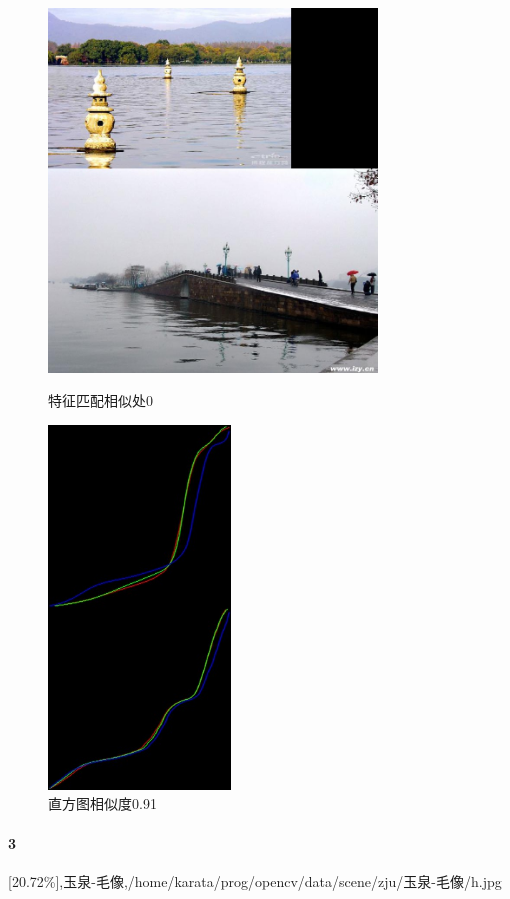 \begin{figure}[htb]
\begin{minipage}[t]{0.5\linewidth}
\centering
\includegraphics[height=3.8in]{三映.jpg.d/im2sift.jpg}
\caption{特征匹配相似处0}
\label{fig:side:a}
\end{minipage}%
\begin{minipage}[t]{0.5\linewidth}
\centering
\includegraphics[height=3.8in]{三映.jpg.d/im2hist2.jpg}
\caption{直方图相似度0.91}
\label{fig:side:a}
\end{minipage}%
\end{figure}

\paragraph{3}
[20.72\%],玉泉-毛像,/home/karata/prog/opencv/data/scene/zju/玉泉-毛像/h.jpg

